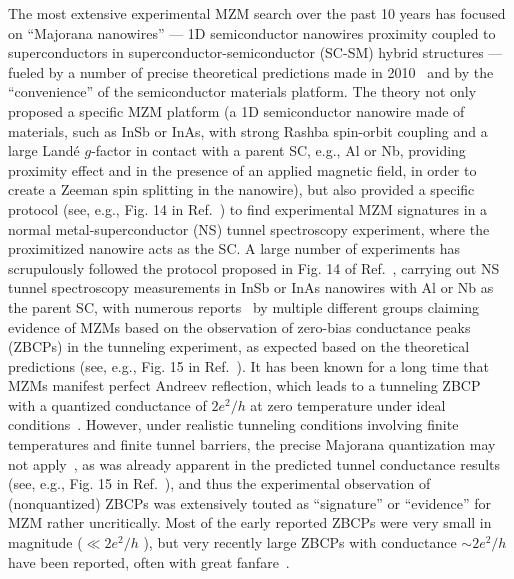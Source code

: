 \documentclass[aps,prmaterials,twocolumn,superscriptaddress,longbibliography]{revtex4-2}
\begin{document}
The most extensive experimental MZM search over the past 10 years has focused on ``Majorana nanowires'' --- 1D semiconductor nanowires proximity coupled to superconductors in superconductor-semiconductor (SC-SM) hybrid structures --- fueled by a number of precise theoretical predictions made in 2010~\cite{sau2010generic,lutchyn2010majorana,oreg2010helical,sau2010nonabelian} and by the ``convenience'' of the semiconductor materials platform. The theory 
 not only proposed a specific MZM platform (a 1D semiconductor nanowire made of materials, such as InSb or InAs, with strong Rashba spin-orbit coupling and a large Land\'e $g$-factor in contact with a parent SC, e.g., Al or Nb, providing proximity effect and in the presence of an applied magnetic field, in order to create a Zeeman spin splitting in the nanowire), but also provided a specific protocol (see, e.g., Fig. 14 in Ref.~) to find experimental MZM signatures in a normal metal-superconductor (NS) tunnel spectroscopy experiment, where the proximitized nanowire acts as the SC.  
 A large number of experiments has scrupulously followed the protocol proposed in Fig. 14 of Ref.~, carrying out NS tunnel spectroscopy measurements in InSb or InAs nanowires with Al or Nb as the parent SC, with numerous reports~\cite{mourik2012signatures,das2012zerobias,deng2012anomalous,churchill2013superconductornanowire,finck2013anomalous, deng2016majorana,nichele2017scaling,zhang2017ballistic,kammhuber2017conductance,gul2018ballistic,vaitiekenas2018effective,moor2018electric,zhang2018quantizeda,bommer2019spinorbit,grivnin2019concomitant,anselmetti2019endtoend,menard2020conductancematrix,puglia2021closing,pan2020situ,zhang2021large,song2021large}  by multiple different groups claiming evidence of MZMs based on the observation of zero-bias conductance peaks (ZBCPs) in the tunneling experiment, as expected based on the theoretical predictions  (see, e.g., Fig. 15 in Ref.~).  
  It has been known for a long time that MZMs manifest perfect Andreev reflection, which leads to a tunneling ZBCP with a quantized conductance of $ 2e^2/h $  at zero temperature under ideal conditions~\cite{sengupta2001midgap,law2009majorana,flensberg2010tunneling,wimmer2011quantum}.   However, under realistic tunneling conditions involving finite temperatures and finite tunnel barriers, the precise Majorana quantization may not apply~\cite{setiawan2017electron,lin2012zerobias}, as was already apparent in the predicted tunnel conductance results (see, e.g.,  Fig. 15 in Ref.~), and thus the experimental observation of (nonquantized) ZBCPs was extensively touted as ``signature'' or ``evidence'' for MZM rather uncritically.  Most of the early reported ZBCPs were very small in magnitude ($ \ll 2e^2/h $ ), but very recently large ZBCPs with conductance $ \sim 2e^2/h $  have been reported, often with great fanfare~\cite{zhang2018quantizeda,zhang2021retraction,zhang2021large,nichele2017scaling}.
\end{document}
